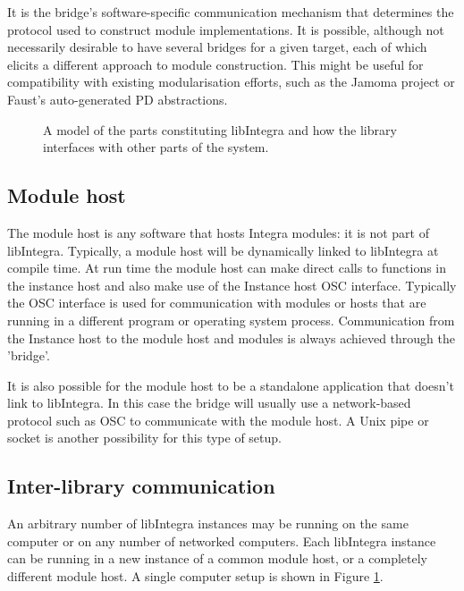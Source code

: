 It is the bridge's software-specific communication mechanism that determines the protocol used to construct module implementations. It is possible, although not necessarily desirable to have several bridges for a given target, each of which elicits a different approach to module construction. This might be useful for compatibility with existing modularisation efforts, such as the Jamoma project or Faust's auto-generated PD abstractions.

\begin{figure}
\centerline{}
\caption{A model of the parts constituting libIntegra and how the library interfaces with other parts of the system.}
\label{fig:model}
\end{figure}

\subsection{Module host}\label{subsec:module_host}

The module host is any software that hosts Integra modules: it is not part of libIntegra. Typically, a module host will be dynamically linked to libIntegra at compile time. At run time the module host can make direct calls to functions in the instance host and also make use of the Instance host OSC interface. Typically the OSC interface is used for communication with modules or hosts that are running in a different program or operating system process. Communication from the Instance host to the module host and modules is always achieved through the 'bridge'.

It is also possible for the module host to be a standalone application that doesn't link to libIntegra. In this case the bridge will usually use a network-based protocol such as OSC to communicate with the module host. A Unix pipe or socket is another possibility for this type of setup.

\subsection{Inter-library communication}\label{subsec:interlib}

An arbitrary number of libIntegra instances may be running on the same computer or on any number of networked computers. Each libIntegra instance can be running in a new instance of a common module host, or a completely different module host. A single computer
setup is shown in Figure \ref{fig:model}. 

